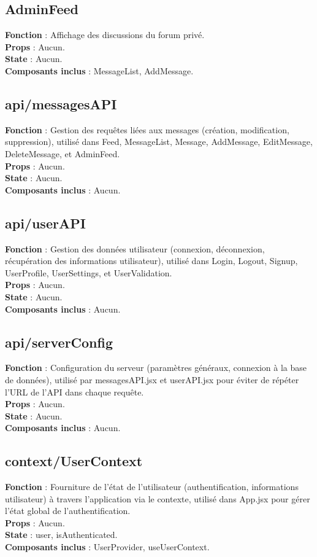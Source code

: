 \documentclass{article}
\begin{document}
\subsection*{AdminFeed}
\textbf{Fonction} : Affichage des discussions du forum privé.\\
\textbf{Props} : Aucun.\\
\textbf{State} : Aucun.\\
\textbf{Composants inclus} : MessageList, AddMessage.

\subsection*{api/messagesAPI}
\textbf{Fonction} : Gestion des requêtes liées aux messages (création, modification, suppression), utilisé dans Feed, MessageList, Message, AddMessage, EditMessage, DeleteMessage, et AdminFeed.\\
\textbf{Props} : Aucun.\\
\textbf{State} : Aucun.\\
\textbf{Composants inclus} : Aucun.

\subsection*{api/userAPI}
\textbf{Fonction} : Gestion des données utilisateur (connexion, déconnexion, récupération des informations utilisateur), utilisé dans Login, Logout, Signup, UserProfile, UserSettings, et UserValidation.\\
\textbf{Props} : Aucun.\\
\textbf{State} : Aucun.\\
\textbf{Composants inclus} : Aucun.

\subsection*{api/serverConfig}
\textbf{Fonction} : Configuration du serveur (paramètres généraux, connexion à la base de données), utilisé par messagesAPI.jsx et userAPI.jsx pour éviter de répéter l’URL de l’API dans chaque requête.\\
\textbf{Props} : Aucun.\\
\textbf{State} : Aucun.\\
\textbf{Composants inclus} : Aucun.

\subsection*{context/UserContext}
\textbf{Fonction} : Fourniture de l'état de l'utilisateur (authentification, informations utilisateur) à travers l'application via le contexte, utilisé dans App.jsx pour gérer l’état global de l’authentification.\\
\textbf{Props} : Aucun.\\
\textbf{State} : user, isAuthenticated.\\
\textbf{Composants inclus} : UserProvider, useUserContext.
\end{document}
